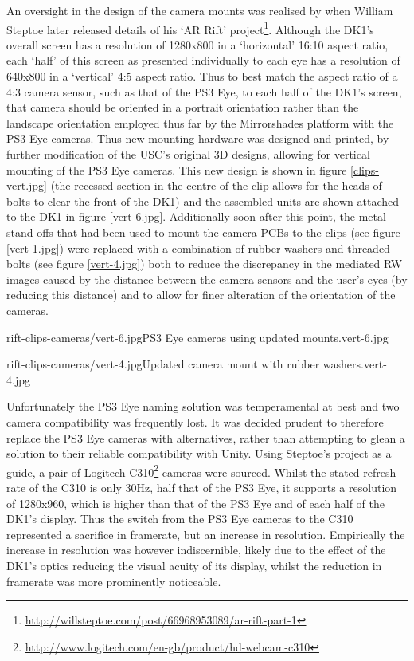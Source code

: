 An oversight in the design of the camera mounts was realised by when William Steptoe later released details of his `AR Rift' project\footnote{\url{http://willsteptoe.com/post/66968953089/ar-rift-part-1}}. Although the DK1's overall screen has a resolution of 1280x800 in a `horizontal' 16:10 aspect ratio, each `half' of this screen as presented individually to each eye has a resolution of 640x800 in a `vertical' 4:5 aspect ratio. Thus to best match the aspect ratio of a 4:3 camera sensor, such as that of the PS3 Eye, to each half of the DK1's screen, that camera should be oriented in a portrait orientation rather than the landscape orientation employed thus far by the Mirrorshades platform with the PS3 Eye cameras. Thus new mounting hardware was designed and printed, by further modification of the USC's original 3D designs, allowing for vertical mounting of the PS3 Eye cameras. This new design is shown in figure \ref{clips-vert.jpg} (the recessed section in the centre of the clip allows for the heads of bolts to clear the front of the DK1) and the assembled units are shown attached to the DK1 in figure \ref{vert-6.jpg}. Additionally soon after this point, the metal stand-offs that had been used to mount the camera PCBs to the clips (see figure \ref{vert-1.jpg}) were replaced with a combination of rubber washers and threaded bolts (see figure \ref{vert-4.jpg}) both to reduce the discrepancy in the mediated RW images caused by the distance between the camera sensors and the user's eyes (by reducing this distance) and to allow for finer alteration of the orientation of the cameras.

       {rift-clips-cameras/vert-6.jpg}{PS3 Eye cameras using updated mounts.}{vert-6.jpg}

       {rift-clips-cameras/vert-4.jpg}{Updated camera mount with rubber washers.}{vert-4.jpg}

Unfortunately the PS3 Eye naming solution was temperamental at best and two camera compatibility was frequently lost. It was decided prudent to therefore replace the PS3 Eye cameras with alternatives, rather than attempting to glean a solution to their reliable compatibility with Unity. Using Steptoe's project as a guide, a pair of Logitech C310\footnote{\url{http://www.logitech.com/en-gb/product/hd-webcam-c310}} cameras were sourced. Whilst the stated refresh rate of the C310 is only 30Hz, half that of the PS3 Eye, it supports a resolution of 1280x960, which is higher than that of the PS3 Eye and of each half of the DK1's display. Thus the switch from the PS3 Eye cameras to the C310 represented a sacrifice in framerate, but an increase in resolution. Empirically the increase in resolution was however indiscernible, likely due to the effect of the DK1's optics reducing the visual acuity of its display, whilst the reduction in framerate was more prominently noticeable.

